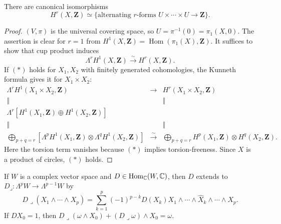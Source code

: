 \begin{theorem}
\label{mumford-frag-integral-cohomology}
There are canonical isomorphisms
\[
 H^r(X,\mathbf Z)\simeq
 \{\text{alternating $r$-forms }U\times\cdots\times U\to\mathbf Z\}.
\]
\end{theorem}
\begin{proof}
$(V,\pi)$ is the universal covering space, so $U=\pi^{-1}(0)=\pi_1(X,0)$.
The assertion is clear for $r=1$ from
$H^1(X,\mathbf Z)=\operatorname{Hom}(\pi_1(X),\mathbf Z)$.  It suffices to
show that cup product induces
\[
 \Lambda^rH^1(X,\mathbf Z)\xrightarrow{\sim}H^r(X,\mathbf Z).
 \tag{*}
\]
If $(*)$ holds for $X_1,X_2$ with finitely generated cohomologies, the
Kunneth formula gives it for $X_1\times X_2$:
\[
\begin{array}{ccc}
\Lambda^rH^1(X_1\times X_2,\mathbf Z)&\longrightarrow&H^r(X_1\times X_2,\mathbf Z)\\
\Vert&&\Vert\\
\Lambda^r[H^1(X_1,\mathbf Z)\oplus H^1(X_2,\mathbf Z)]&&\\
\Vert&&\Vert\\
\displaystyle\bigoplus_{p+q=r}[\Lambda^pH^1(X_1,\mathbf Z)\otimes\Lambda^qH^1(X_2,\mathbf Z)]&\xrightarrow{\sim}&
\displaystyle\bigoplus_{p+q=r}H^p(X_1,\mathbf Z)\otimes H^q(X_2,\mathbf Z).
\end{array}
\]
Here the torsion term vanishes because $(*)$ implies torsion-freeness.  Since
$X$ is a product of circles, $(*)$ holds.
\end{proof}

\begin{lemma}
\label{mumford-frag-interior}
If $W$ is a complex vector space and $D\in\operatorname{Hom}_{\mathbb{C}}(W,\mathbb{C})$,
then $D$ extends to $D\mathbin{\lrcorner}:\Lambda^pW\to\Lambda^{p-1}W$ by
\[
 D\mathbin{\lrcorner}(X_1\wedge\cdots\wedge X_p)=
 \sum_{k=1}^p(-1)^{p-k}D(X_k)X_1\wedge\cdots\wedge\widehat X_k\wedge\cdots\wedge X_p.
\]
If $DX_0=1$, then
$D\mathbin{\lrcorner}(\omega\wedge X_0)+(D\mathbin{\lrcorner}\omega)\wedge X_0=\omega$.
\end{lemma}

